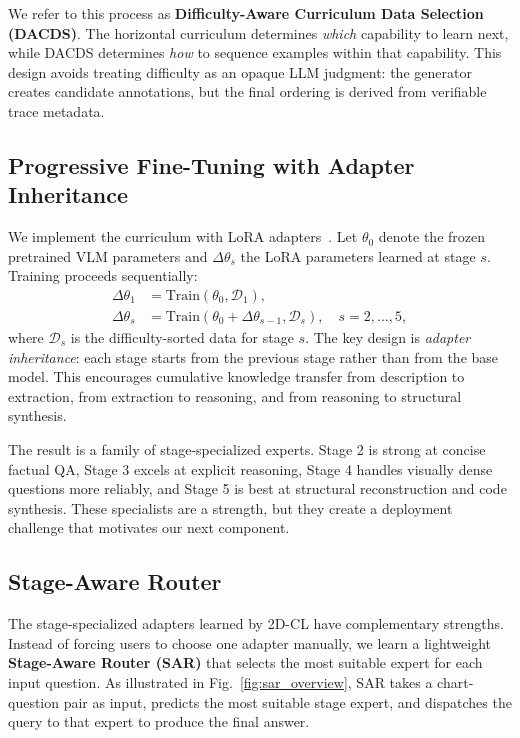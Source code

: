 \documentclass[journal]{IEEEtran}
\newcommand{\method}{2D-CL}
\newcommand{\dacds}{DACDS}
\newcommand{\sar}{SAR}
\begin{document}
We refer to this process as \textbf{Difficulty-Aware Curriculum Data Selection (\dacds{})}.
The horizontal curriculum determines \emph{which} capability to learn next, while \dacds{} determines \emph{how} to sequence examples within that capability.
This design avoids treating difficulty as an opaque LLM judgment: the generator creates candidate annotations, but the final ordering is derived from verifiable trace metadata.

\subsection{Progressive Fine-Tuning with Adapter Inheritance}
\label{sec:adapter}
We implement the curriculum with LoRA adapters~\cite{hu2022lora}.
Let $\theta_0$ denote the frozen pretrained VLM parameters and $\Delta\theta_s$ the LoRA parameters learned at stage $s$.
Training proceeds sequentially:
\begin{align}
    \Delta\theta_1 &= \text{Train}(\theta_0, \mathcal{D}_1), \\
    \Delta\theta_s &= \text{Train}(\theta_0 + \Delta\theta_{s-1}, \mathcal{D}_s), \quad s=2,\ldots,5,
\end{align}
where $\mathcal{D}_s$ is the difficulty-sorted data for stage $s$.
The key design is \emph{adapter inheritance}: each stage starts from the previous stage rather than from the base model.
This encourages cumulative knowledge transfer from description to extraction, from extraction to reasoning, and from reasoning to structural synthesis.

The result is a family of stage-specialized experts.
Stage 2 is strong at concise factual QA, Stage 3 excels at explicit reasoning, Stage 4 handles visually dense questions more reliably, and Stage 5 is best at structural reconstruction and code synthesis.
These specialists are a strength, but they create a deployment challenge that motivates our next component.

\subsection{Stage-Aware Router}
\label{sec:router}
The stage-specialized adapters learned by \method{} have complementary strengths.
Instead of forcing users to choose one adapter manually, we learn a lightweight \textbf{Stage-Aware Router (\sar{})} that selects the most suitable expert for each input question.
As illustrated in Fig.~\ref{fig:sar_overview}, \sar{} takes a chart-question pair as input, predicts the most suitable stage expert, and dispatches the query to that expert to produce the final answer.
\end{document}
